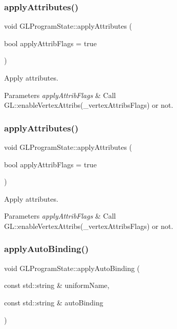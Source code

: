 \subsubsection{\texorpdfstring{apply\+Attributes()}{applyAttributes()}\hspace{0.1cm}{\footnotesize\ttfamily [1/2]}}
{\footnotesize\ttfamily void G\+L\+Program\+State\+::apply\+Attributes (\begin{DoxyParamCaption}\item[{bool}]{apply\+Attrib\+Flags = {\ttfamily true} }\end{DoxyParamCaption})}

Apply attributes. 
\begin{DoxyParams}{Parameters}
{\em apply\+Attrib\+Flags} & Call G\+L\+::enable\+Vertex\+Attribs(\+\_\+vertex\+Attribs\+Flags) or not. \\
\hline
\end{DoxyParams}
\mbox{\label{classGLProgramState_af524cc2e3b621997336d5b58f221c624}} 
\subsubsection{\texorpdfstring{apply\+Attributes()}{applyAttributes()}\hspace{0.1cm}{\footnotesize\ttfamily [2/2]}}
{\footnotesize\ttfamily void G\+L\+Program\+State\+::apply\+Attributes (\begin{DoxyParamCaption}\item[{bool}]{apply\+Attrib\+Flags = {\ttfamily true} }\end{DoxyParamCaption})}

Apply attributes. 
\begin{DoxyParams}{Parameters}
{\em apply\+Attrib\+Flags} & Call G\+L\+::enable\+Vertex\+Attribs(\+\_\+vertex\+Attribs\+Flags) or not. \\
\hline
\end{DoxyParams}
\mbox{\label{classGLProgramState_a495c04e63419504e616bae7795bf0af9}} 
\subsubsection{\texorpdfstring{apply\+Auto\+Binding()}{applyAutoBinding()}\hspace{0.1cm}{\footnotesize\ttfamily [1/2]}}
{\footnotesize\ttfamily void G\+L\+Program\+State\+::apply\+Auto\+Binding (\begin{DoxyParamCaption}\item[{const std\+::string \&}]{uniform\+Name,  }\item[{const std\+::string \&}]{auto\+Binding }\end{DoxyParamCaption})}

